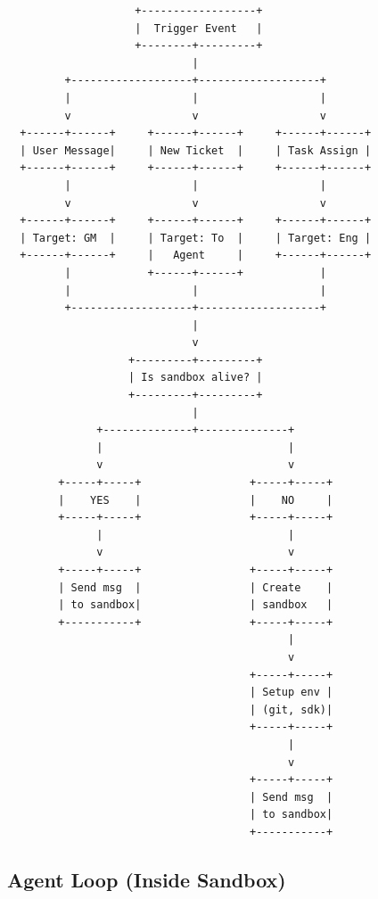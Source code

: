 \documentclass[11pt,a4paper]{article}
\begin{document}
\begin{verbatim}
                    +------------------+
                    |  Trigger Event   |
                    +--------+---------+
                             |
         +-------------------+-------------------+
         |                   |                   |
         v                   v                   v
  +------+------+     +------+------+     +------+------+
  | User Message|     | New Ticket  |     | Task Assign |
  +------+------+     +------+------+     +------+------+
         |                   |                   |
         v                   v                   v
  +------+------+     +------+------+     +------+------+
  | Target: GM  |     | Target: To  |     | Target: Eng |
  +------+------+     |   Agent     |     +------+------+
         |            +------+------+            |
         |                   |                   |
         +-------------------+-------------------+
                             |
                             v
                   +---------+---------+
                   | Is sandbox alive? |
                   +---------+---------+
                             |
              +--------------+--------------+
              |                             |
              v                             v
        +-----+-----+                 +-----+-----+
        |    YES    |                 |    NO     |
        +-----+-----+                 +-----+-----+
              |                             |
              v                             v
        +-----+-----+                 +-----+-----+
        | Send msg  |                 | Create    |
        | to sandbox|                 | sandbox   |
        +-----------+                 +-----+-----+
                                            |
                                            v
                                      +-----+-----+
                                      | Setup env |
                                      | (git, sdk)|
                                      +-----+-----+
                                            |
                                            v
                                      +-----+-----+
                                      | Send msg  |
                                      | to sandbox|
                                      +-----------+
\end{verbatim}

\subsection{Agent Loop (Inside Sandbox)}
\end{document}
